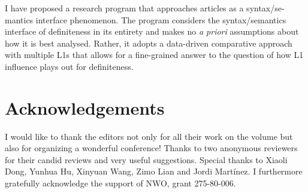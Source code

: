 \documentclass[output=paper,
modfonts
]{langscibook}
\begin{document}
I have proposed a research program that approaches articles as a syntax/se\hyp{}mantics interface phenomenon. The program considers the syntax/semantics interface of definiteness in its entirety and makes no \textit{a priori} assumptions about how it is best analysed. Rather, it adopts a data-driven comparative approach with multiple L1s that allows for a fine-grained answer to the question of how L1 influence plays out for definiteness.

\section*{Acknowledgements}
I would like to thank the editors not only for all their work on the
volume but also for organizing a wonderful conference! Thanks to two
anonymous reviewers for their candid reviews and very useful
suggestions. Special thanks to Xiaoli Dong, Yunhua Hu, Xinyuan Wang,
Zimo Lian and Jordi Martínez. I furthermore gratefully acknowledge the
support of NWO, grant 275-80-006.

{\sloppy
\printbibliography[heading=subbibliography,notkeyword=this]}
\end{document}

